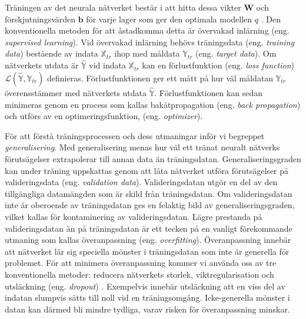 Träningen av det neurala nätverket består i att hitta dessa vikter $\textbf{W}$ och förskjutningsvärden $\textbf{b}$ för varje lager som ger den optimala modellen $q$ \cite{Chollet}. Den konventionella metoden för att åstadkomma detta är övervakad inlärning (eng. \emph{supervised learning}). Vid övervakad inlärning behövs träningsdata (eng. \emph{training data}) bestående av indata $\mathbb{X}_{tr}$ ihop med måldata $\mathbb{Y}_{tr}$ (eng. \emph{target data}). Om nätverkets utdata är $\mathbb{\hat{Y}}$ vid indata $\mathbb{X}_{tr}$ kan en förlustfunktion (eng. \emph{loss function}) $\mathcal{L}\left(\mathbb{\hat{Y}}, \mathbb{Y}_{tr} \right)$ definieras. Förlustfunktionen ger ett mått på hur väl måldatan $\mathbb{Y}_{tr}$ överensstämmer med nätverkets utdata $\mathbb{\hat{Y}}$. Förlustfunktionen kan sedan minimeras genom en process som kallas bakåtpropagation (eng. \emph{back propagation}) och utförs av en optimeringsfunktion, (eng. \emph{optimizer}).

%         

För att förstå träningsprocessen och dess utmaningar inför vi begreppet \emph{generalisering}. Med generalisering menas hur väl ett tränat neuralt nätverks förutsägelser extrapolerar till annan data än träningsdatan. Generaliseringsgraden kan under träning uppskattas genom att låta nätverket utföra förutsägelser på valideringsdata (eng. \emph{validation data}). Valideringsdatan utgör en del av den tillgängliga datamängden som är skild från träningsdatan. Om valideringsdatan inte är oberoende av träningsdatan ges en felaktig bild av generaliseringsgraden, vilket kallas för kontaminering av valideringsdatan. Lägre prestanda på valideringsdatan än på träningsdatan är ett tecken på en vanligt förekommande utmaning som kallas överanpassning (eng. \emph{overfitting}). Överanpassning innebär att nätverket lär sig speciella mönster i träningsdatan som inte är generella för problemet. För att minimera överanpassning kommer vi använda oss av tre konventionella metoder: reducera nätverkets storlek, viktregularisation och utsläckning (eng. \emph{dropout}) \cite{Chollet}. Exempelvis innebär utsläckning att en viss del av indatan slumpvis sätts till noll vid en träningsomgång. Icke-generella mönster i datan kan därmed bli mindre tydliga, varav risken för överanpassning minskar.

